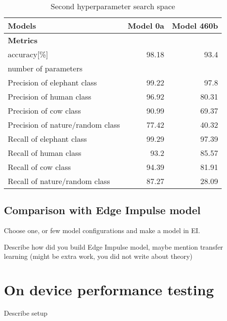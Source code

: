 \begin{table}
    \centering
    \begin{tabular}{ lrr}    \toprule
        \textbf{Models}                 & Model 0a & Model 460b\\\toprule
        \textbf{Metrics}                &&\\\toprule
        accuracy[\%]                    & 98.18 & 93.4\\
        number of parameters            &&\\ 
        Precision of elephant class     & 99.22 & 97.8 \\
        Precision of human class        & 96.92 & 80.31\\
        Precision of cow class          & 90.99 & 69.37\\
        Precision of nature/random class& 77.42 & 40.32\\
        Recall of elephant class        & 99.29 & 97.39\\
        Recall of human class           & 93.2  & 85.57\\
        Recall of cow class             & 94.39 & 81.91\\
        Recall of nature/random class   & 87.27 & 28.09\\
    \end{tabular}
    \caption{ Second hyperparameter search space}
    \label{hyper_table2}
\end{table}

















\subsection{ Comparison with Edge Impulse model}

Choose one, or few model configurations and make a model in EI.

Describe how did you build Edge Impulse model, maybe mention transfer learning (might be extra work, you did not write about theory)




\section{ On device performance testing}
Describe setup

